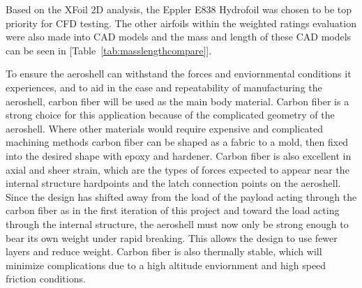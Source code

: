 Based on the XFoil 2D analysis, the Eppler E838 Hydrofoil was chosen to be top priority for CFD testing. The other airfoils within the weighted ratings evaluation were also made into CAD models and the mass and length of these CAD models can be seen in [Table~\ref{tab:masslengthcompare}].

\begin{table}[H]
\caption{\label{tab:masslengthcompare}Airfoil mass and length comparison.}
\centering
{}
\end{table}

\indent\indent To ensure the aeroshell can withstand the forces and enviornmental conditions it experiences, and to aid in the ease and repeatability of manufacturing the aeroshell, carbon fiber will be used as the main body material. Carbon fiber is a strong choice for this application because of the complicated geometry of the aeroshell. Where other materials would require expensive and complicated machining methods carbon fiber can be shaped as a fabric to a mold, then fixed into the desired shape with epoxy and hardener. Carbon fiber is also excellent in axial and sheer strain, which are the types of forces expected to appear near the internal structure hardpoints and the latch connection points on the aeroshell. Since the design has shifted away from the load of the payload acting through the carbon fiber as in the first iteration of this project and toward the load acting through the internal structure, the aeroshell must now only be strong enough to bear its own weight under rapid breaking. This allows the design to use fewer layers and reduce weight. Carbon fiber is also thermally stable, which will minimize complications due to a high altitude enviornment and high speed friction conditions.

